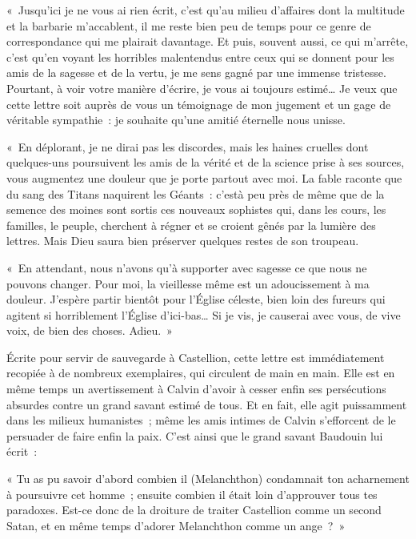 \documentclass[french,twoside]{book} %
\newcommand{\astermono}{\medskip\centerline{\color{rubric}\large\selectfont{\syms ✻}}\medskip\par}%
\newenvironment{quoteblock}%
  {\begin{quoting}}
  {\end{quoting}}
\newenvironment{quotebar}{%
    \def\FrameCommand{{\color{rubric!10!}\vrule width 0.5em} \hspace{0.9em}}%
    \def\OuterFrameSep{2pt} %
    \MakeFramed {\advance\hsize-\width \FrameRestore}
  }%
  {%
    \endMakeFramed
  }
\renewenvironment{quoteblock}%
  {%
    \savenotes
    \setstretch{0.9}
    \normalfont
    \begin{quotebar}
  }
  {%
    \end{quotebar}
    \spewnotes
  }
\begin{document}
\begin{quoteblock}
 \noindent « Jusqu’ici je ne vous ai rien écrit, c’est qu’au milieu d’affaires dont la multitude et la barbarie m’accablent, il me reste bien peu de temps pour ce genre de correspondance qui me plairait davantage. Et puis, souvent aussi, ce qui m’arrête, c’est qu’en voyant les horribles malentendus entre ceux qui se donnent pour les amis de la sagesse et de la vertu, je me sens gagné par une immense tristesse. Pourtant, à voir votre manière d’écrire, je vous ai toujours estimé… Je veux que cette lettre soit auprès de vous un témoignage de mon jugement et un gage de véritable sympathie : je souhaite qu’une amitié éternelle nous unisse.\par
 « En déplorant, je ne dirai pas les discordes, mais les haines cruelles dont quelques-uns poursuivent les amis de la vérité et de la science prise à ses sources, vous augmentez une douleur que je porte partout avec moi. La fable raconte que du sang des Titans naquirent les Géants : c’està peu près de même que de la semence des moines sont sortis ces nouveaux sophistes qui, dans les cours, les familles, le peuple, cherchent à régner et se croient gênés par la lumière des lettres. Mais Dieu saura bien préserver quelques restes de son troupeau.\par
 « En attendant, nous n’avons qu’à supporter avec sagesse ce que nous ne pouvons changer. Pour moi, la vieillesse même est un adoucissement à ma douleur. J’espère partir bientôt pour l’Église céleste, bien loin des fureurs qui agitent si horriblement l’Église d’ici-bas… Si je vis, je causerai avec vous, de vive voix, de bien des choses. Adieu. »
 \end{quoteblock}


\astermono

\noindent Écrite pour servir de sauvegarde à Castellion, cette lettre est immédiatement recopiée à de nombreux exemplaires, qui circulent de main en main. Elle est en même temps un avertissement à Calvin d’avoir à cesser enfin ses persécutions absurdes contre un grand savant estimé de tous. Et en fait, elle agit puissamment dans les milieux humanistes ; même les amis intimes de Calvin s’efforcent de le persuader de faire enfin la paix. C’est ainsi que le grand savant Baudouin lui écrit :\par

\begin{quoteblock}
\noindent « Tu as pu savoir d’abord combien il (Melanchthon) condamnait ton acharnement à poursuivre cet homme ; ensuite combien il était loin d’approuver tous tes paradoxes. Est-ce donc de la droiture de traiter Castellion comme un second Satan, et en même temps d’adorer Melanchthon comme un ange ? »\end{quoteblock}
\end{document}
